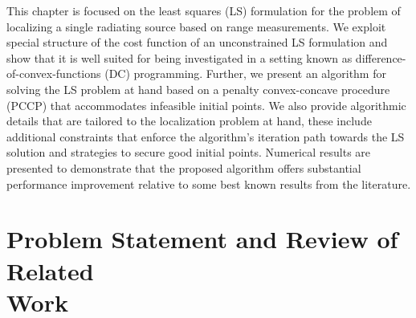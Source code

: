 \label{chapter:pccp}


%
%
%
%
%
%
%


This chapter is focused on the least squares (LS) formulation for the problem of localizing a single radiating source based on range measurements.   We exploit special structure of the cost function of an unconstrained LS formulation and show that it is well suited for being investigated in a setting known as difference-of-convex-functions (DC) programming. Further, we present an algorithm for solving the LS problem at hand based on a penalty convex-concave procedure (PCCP) \cite{LBoyd} that accommodates infeasible initial points. We also provide algorithmic details that are tailored to the localization problem at hand, these include additional constraints that enforce the algorithm’s  iteration path towards the LS solution and strategies to secure good initial points. %
Numerical results are presented to demonstrate that the proposed algorithm offers substantial performance improvement relative to some best known results from the literature.


\section{Problem Statement and Review of Related\\ Work}%


